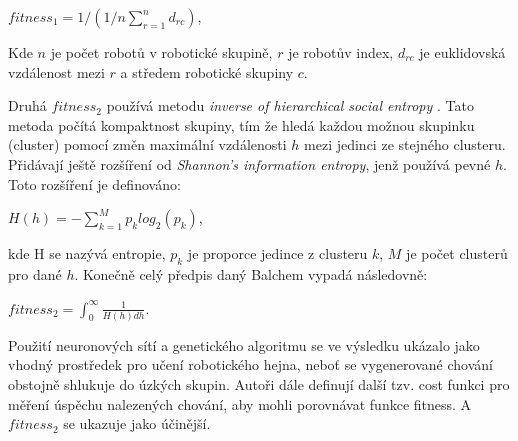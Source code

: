 \par
\begin{center}
\textbf{$fitness_1 = 1/(1/n\sum\limits_{r=1}^{n} d_{rc}) $},
\end{center}
\par 
Kde $n$ je počet robotů v robotické skupině, $r$ je robotův index, $d_{rc}$ je euklidovská vzdálenost mezi $r$ a středem robotické skupiny $c$. 
\par
Druhá $fitness_2$ používá metodu \textit{inverse of hierarchical social entropy} \citep{balch2000hierarchic}. Tato metoda počítá kompaktnost skupiny, tím že hledá každou možnou skupinku (cluster) pomocí změn maximální vzdálenosti $h$ mezi jedinci ze stejného clusteru. Přidávají ještě rozšíření od \textit{Shannon's information entropy}, jenž používá pevné $h$. Toto rozšíření je definováno: 
\par 
\begin{center}
\textbf{$H(h)=-\sum\limits_{k=1}^{M} p_k log_2(p_k)$},
\end{center}
\par 
kde H se nazývá entropie, $p_k$ je proporce jedince z clusteru $k$, $M$ je počet clusterů pro dané $h$. Konečně celý předpis daný Balchem vypadá následovně: 
\par
\begin{center}
\textbf{$fitness_2 = \int_{0}^{\infty} \frac{1}{H(h)dh}$}.
\end{center}
\par 
Použití neuronových sítí a genetického algoritmu se ve výsledku ukázalo jako vhodný prostředek pro učení robotického hejna, neboť se vygenerované chování obstojně shlukuje do úzkých skupin. Autoři dále definují další tzv. cost funkci pro měření úspěchu nalezených chování, aby mohli porovnávat funkce fitness. A $fitness_2$ se ukazuje jako účinější. 
